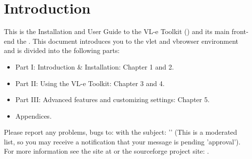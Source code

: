 \chapter{Introduction}
\label{sec:Introduction}




This is the Installation and User Guide to the VL-e Toolkit (\vlet) and its
main front-end the \vbrowser. 
This document introduces you to the vlet and vbrowser 
environment and is divided into the following parts: 

\begin{itemize} 
  \item 
    Part I: Introduction \& Installation: Chapter 1 and 2.
  \item 
    Part II: Using the VL-e Toolkit: Chapter 3 and 4. 
  \item
    Part III: Advanced features and customizing settings: Chapter 5.  
  \item
    Appendices.  
\end{itemize} 

Please report any problems, bugs to:  with the subject: 
'' (This is a moderated list, so you may receive a
notification that your message is pending 'approval'). \\
For more information see the site at  or the
sourceforge project site: .


